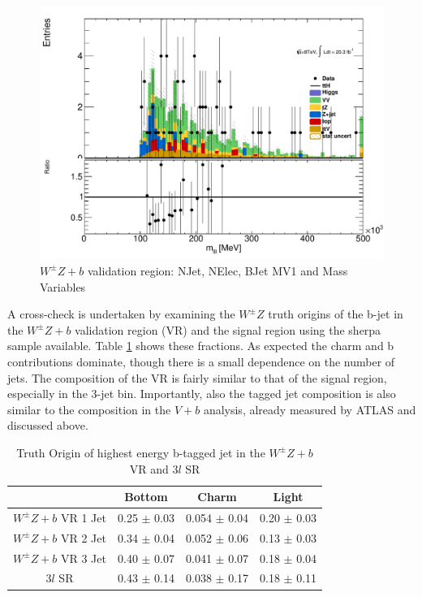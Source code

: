 \begin{figure}[!htbp]
\begin{minipage}[h]{0.5\textwidth}
    \centering \includegraphics[width=\textwidth]{figs/WZ/plotCand_3lep_VVb_Mlll}
  \end{minipage}\hfill
\caption{$W^{\pm}Z+b$ validation region: NJet, NElec, BJet MV1 and Mass Variables} 
\label{fig:wz_z_b}
\end{figure} 

A cross-check is undertaken by examining the $W^{\pm}Z$ truth origins of the b-jet in the $W^{\pm}Z+b$ validation region (VR) and the signal region using the sherpa sample available. Table \ref{table:wz_truth} shows these fractions. As expected the charm and b contributions dominate, though there is a small dependence on the number of jets. The composition of the VR is fairly similar to that of the signal region, especially in the 3-jet bin. Importantly, also the tagged jet composition is also similar to the composition in the $V+b$ analysis, already measured by ATLAS and discussed above. 

\begin{table}[htbp]
\centering 
\begin{tabular}{|c|c|c|c|} 
  \hline
  & Bottom  & Charm & Light \\
  \hline
  $W^{\pm}Z+b$ VR 1 Jet& 0.25 $\pm$ 0.03 & 0.054  $\pm$ 0.04 & 0.20 $\pm$ 0.03 \\ 
  $W^{\pm}Z+b$ VR 2 Jet& 0.34 $\pm$ 0.04 & 0.052  $\pm$ 0.06 & 0.13 $\pm$ 0.03 \\ 
  $W^{\pm}Z+b$ VR 3 Jet& 0.40 $\pm$ 0.07 & 0.041  $\pm$ 0.07 & 0.18 $\pm$ 0.04 \\
  3$l$ SR              & 0.43 $\pm$ 0.14 & 0.038  $\pm$ 0.17 & 0.18 $\pm$ 0.11 \\
  \hline 
\end{tabular}
\caption{Truth Origin of highest energy b-tagged jet in the $W^{\pm}Z+b$ VR and 3$l$ SR} 
\label{table:wz_truth}
\end{table} 

